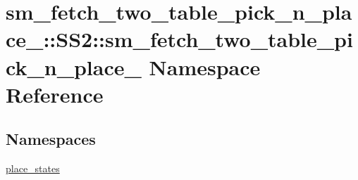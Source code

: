 \hypertarget{namespacesm__fetch__two__table__pick__n__place__1_1_1SS2_1_1sm__fetch__two__table__pick__n__place__1}{}\section{sm\+\_\+fetch\+\_\+two\+\_\+table\+\_\+pick\+\_\+n\+\_\+place\+\_\+:\+:S\+S2\+:\+:sm\+\_\+fetch\+\_\+two\+\_\+table\+\_\+pick\+\_\+n\+\_\+place\+\_ Namespace Reference}
\label{namespacesm__fetch__two__table__pick__n__place__1_1_1SS2_1_1sm__fetch__two__table__pick__n__place__1}
\subsection*{Namespaces}
\begin{DoxyCompactItemize}
\item 
 \hyperlink{namespacesm__fetch__two__table__pick__n__place__1_1_1SS2_1_1sm__fetch__two__table__pick__n__place__1_1_1place__states}{place\+\_\+states}
\end{DoxyCompactItemize}
